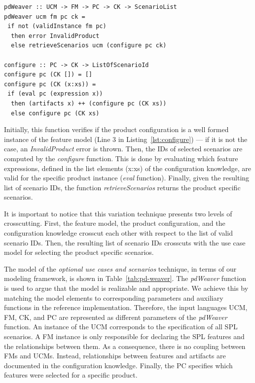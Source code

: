 \documentclass[times, 11pt,twocolumn]{article}
\begin{document}
\begin{lstlisting}[belowskip=20pt,frame=tb,caption={Product derivation weaver function},label=lst:configure]
pdWeaver :: UCM -> FM -> PC -> CK -> ScenarioList
pdWeaver ucm fm pc ck = 
 if not (validInstance fm pc) 
  then error InvalidProduct
  else retrieveScenarios ucm (configure pc ck)

configure :: PC -> CK -> ListOfScenarioId
configure pc (CK []) = []
configure pc (CK (x:xs)) =
 if (eval pc (expression x))
  then (artifacts x) ++ (configure pc (CK xs))
  else configure pc (CK xs)
\end{lstlisting} 

Initially, this function verifies if the product configuration is a well formed
instance of the feature model (Line 3 in Listing~\ref{lst:configure}) --- if it is not
the case,  an \emph{InvalidProduct} error is thrown. Then, the IDs of selected
scenarios are computed by the \emph{configure} function. This is done by
evaluating which feature expressions, defined in the list elements (x:xs) of
the configuration knowledge, are valid for the specific product instance
(\emph{eval} function). Finally, given the resulting list of scenario IDs, the function
\emph{retrieveScenarios} returns the product specific scenarios. 

It is important to notice that this variation technique presents two levels of
crosscutting. First, the feature model, the product configuration, and
the configuration knowledge crosscut each other with respect to the
list of valid scenario IDs. Then, the resulting list of scenario IDs crosscuts
with the use case model for selecting the product specific scenarios.   

The model of the \emph{optional use cases and scenarios} technique, in terms of
our modeling framework, is shown in Table~\ref{tab:pd-weaver}. The
\emph{pdWeaver} function is used to argue that the model is realizable and
appropriate. We achieve this by matching the model elements to corresponding parameters 
and auxiliary functions in the reference implementation. Therefore, the input languages UCM,
FM, CK, and PC are represented as different parameters of the \emph{pdWeaver}
function. An instance of the UCM corresponds to the specification of all SPL
scenarios. A FM instance is only responsible for declaring the SPL features and
the relationships between them. As a consequence, there is no coupling between
FMs and UCMs. Instead, relationships between features and artifacts are
documented in the configuration knowledge. Finally, the PC specifies which
features were selected for a specific product. 
\end{document}
